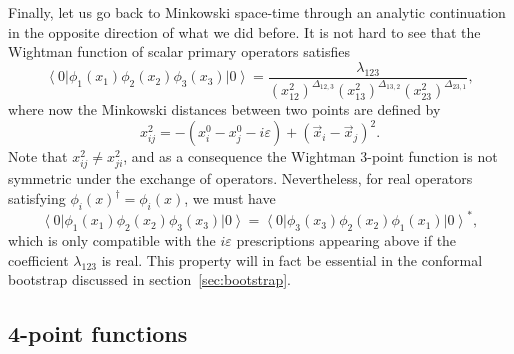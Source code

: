 \documentclass[a4paper,12pt]{article}
\newcommand{\ket}[1]{\left| #1 \right\rangle}
\newcommand{\bra}[1]{\left\langle #1 \right|}
\numberwithin{equation}{section}
\begin{document}
Finally, let us go back to Minkowski space-time through an analytic continuation in the opposite direction of what we did before. It is not hard to see that the Wightman function of scalar primary operators satisfies
\begin{equation}
	\bra{0} \phi_1(x_1) \phi_2(x_2) \phi_3(x_3) \ket{0}
	= \frac{\lambda_{123}}
	{(x_{12}^2)^{\Delta_{12,3}}
	(x_{13}^2)^{\Delta_{13,2}}
	(x_{23}^2)^{\Delta_{23,1}}},
\end{equation}
where now the Minkowski distances between two points are defined by
\begin{equation}
	x_{ij}^2 = -(x_i^0 - x_j^0 - i \varepsilon)
	+ (\vec{x}_i - \vec{x}_j)^2.
	\label{eq:Minkowskidistance}
\end{equation}
Note that $x_{ij}^2 \neq x_{ji}^2$, and as a consequence the Wightman 3-point function is not symmetric under the exchange of operators.
Nevertheless, for real operators satisfying $\phi_i(x)^\dagger = \phi_i(x)$, we must have
\begin{equation}
	\bra{0} \phi_1(x_1) \phi_2(x_2) \phi_3(x_3) \ket{0}
	= \bra{0} \phi_3(x_3) \phi_2(x_2) \phi_1(x_1) \ket{0}^*,
\end{equation}
which is only compatible with the $i \varepsilon$ prescriptions appearing above if the coefficient $\lambda_{123}$ is real.
This property will in fact be essential in the conformal bootstrap discussed in section~\ref{sec:bootstrap}.


\subsection{4-point functions}
\end{document}
